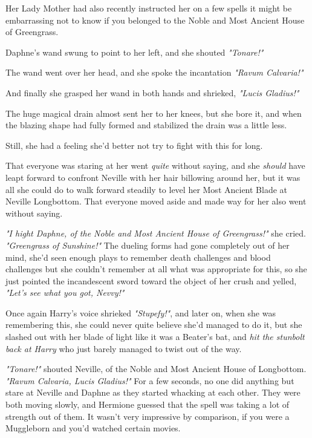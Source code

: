 Her Lady Mother had also recently instructed her on a few spells it might be
embarrassing not to know if you belonged to the Noble and Most Ancient House of
Greengrass.

Daphne's wand swung to point to her left, and she shouted \emph{"Tonare!"}

The wand went over her head, and she spoke the incantation \emph{"Ravum
Calvaria!"}

And finally she grasped her wand in both hands and shrieked, \emph{"Lucis
Gladius!"}

The huge magical drain almost sent her to her knees, but she bore it, and when
the blazing shape had fully formed and stabilized the drain was a little less.

Still, she had a feeling she'd better not try to fight with this for long.

That everyone was staring at her went \emph{quite} without saying, and she
\emph{should} have leapt forward to confront Neville with her hair billowing
around her, but it was all she could do to walk forward steadily to level her
Most Ancient Blade at Neville Longbottom. That everyone moved aside and made
way for her also went without saying.

\emph{"I hight Daphne, of the Noble and Most Ancient House of Greengrass!"} she
cried. \emph{"Greengrass of Sunshine!"} The dueling forms had gone completely
out of her mind, she'd seen enough plays to remember death challenges and blood
challenges but she couldn't remember at all what was appropriate for this, so
she just pointed the incandescent sword toward the object of her crush and
yelled, \emph{"Let's see what you got, Nevvy!"}

Once again Harry's voice shrieked \emph{"Stupefy!"}, and later on, when she was
remembering this, she could never quite believe she'd managed to do it, but she
slashed out with her blade of light like it was a Beater's bat, and \emph{hit
the stunbolt back at Harry} who just barely managed to twist out of the way.

\emph{"Tonare!"} shouted Neville, of the Noble and Most Ancient House of
Longbottom. \emph{"Ravum Calvaria, Lucis Gladius!"}
\sbreak
For a few seconds, no one did anything but stare at Neville and Daphne as they
started whacking at each other. They were both moving slowly, and Hermione
guessed that the spell was taking a lot of strength out of them. It wasn't very
impressive by comparison, if you were a Muggleborn and you'd watched certain
movies.

